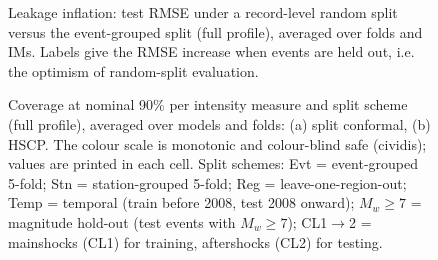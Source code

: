 
\begin{figure}[htbp]
\centering
{}
\caption{Leakage inflation: test RMSE under a record-level random split versus the event-grouped split (full profile), averaged over folds and IMs. Labels give the RMSE increase when events are held out, i.e. the optimism of random-split evaluation.}
\label{fig:figS1_random_leakage_inflation}
\end{figure}

\begin{figure}[htbp]
\centering
{}
\caption{Coverage at nominal 90\% per intensity measure and split scheme (full profile), averaged over models and folds: (a) split conformal, (b) HSCP. The colour scale is monotonic and colour-blind safe (cividis); values are printed in each cell. Split schemes: Evt = event-grouped 5-fold; Stn = station-grouped 5-fold; Reg = leave-one-region-out; Temp = temporal (train before 2008, test 2008 onward); $M_w{\geq}7$ = magnitude hold-out (test events with $M_w \geq 7$); CL1$\rightarrow$2 = mainshocks (CL1) for training, aftershocks (CL2) for testing.}
\label{fig:figS2_period_coverage_heatmap}
\end{figure}
